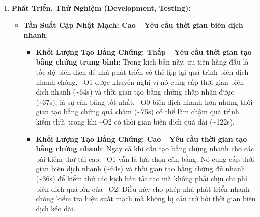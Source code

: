 \begin{enumerate}
    \item \textbf{Phát Triển, Thử Nghiệm (Development, Testing):}
    \begin{itemize}
        \item \textbf{Tần Suất Cập Nhật Mạch: Cao} -- \textbf{Yêu cầu thời gian biên dịch nhanh}:
        \begin{itemize}
            \item \textbf{Khối Lượng Tạo Bằng Chứng: Thấp} -- \textbf{Yêu cầu thời gian tạo bằng chứng trung bình}: Trong kịch bản này, ưu tiên hàng đầu là tốc độ biên dịch để nhà phát triển có thể lặp lại quá trình biên dịch nhanh chóng. --O1 được khuyến nghị vì nó cung cấp thời gian biên dịch nhanh (\textasciitilde 64s) và thời gian tạo bằng chứng chấp nhận được (\textasciitilde 37s), là sự cân bằng tốt nhất. --O0 biên dịch nhanh hơn nhưng thời gian tạo bằng chứng quá chậm (\textasciitilde 75s) có thể làm chậm quá trình kiểm thử, trong khi --O2 có thời gian biên dịch quá dài (\textasciitilde 122s).
            \item \textbf{Khối Lượng Tạo Bằng Chứng: Cao} -- \textbf{Yêu cầu thời gian tạo bằng chứng nhanh}: Ngay cả khi cần tạo bằng chứng nhanh cho các bài kiểm thử tải cao, --O1 vẫn là lựa chọn cân bằng. Nó cung cấp thời gian biên dịch nhanh (\textasciitilde 64s) và thời gian tạo bằng chứng đủ nhanh (\textasciitilde 36s) để kiểm thử các kịch bản tải cao mà không phải chịu chi phí biên dịch quá lớn của --O2. Điều này cho phép nhà phát triển nhanh chóng kiểm tra hiệu suất mạch mà không bị cản trở bởi thời gian biên dịch kéo dài.
        \end{itemize}
    \end{itemize}


\end{enumerate}
